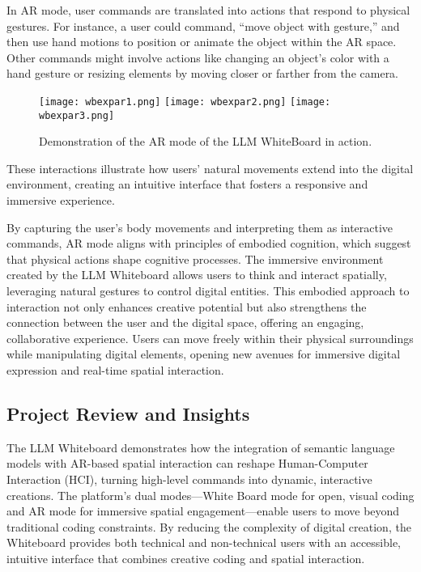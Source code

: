 In AR mode, user commands are translated into actions that respond to physical gestures.
For instance, a user could command, “move object with gesture,” and then use hand motions to position or animate the object within the AR space.
Other commands might involve actions like changing an object’s color with a hand gesture or resizing elements by moving closer or farther from the camera.

\begin{figure}[h!]
    \centering
    \texttt{[image: wbexpar1.png]}
    \texttt{[image: wbexpar2.png]}
    \texttt{[image: wbexpar3.png]}
    \caption{Demonstration of the AR mode of the LLM WhiteBoard in action.}
    \vspace{0.1cm}
    \label{fig:wbdemo1}
\end{figure}

These interactions illustrate how users’ natural movements extend into the digital environment, creating an intuitive interface that fosters a responsive and immersive experience.

By capturing the user's body movements and interpreting them as interactive commands, AR mode aligns with principles of embodied cognition, which suggest that physical actions shape cognitive processes.
The immersive environment created by the LLM Whiteboard allows users to think and interact spatially, leveraging natural gestures to control digital entities.
This embodied approach to interaction not only enhances creative potential but also strengthens the connection between the user and the digital space, offering an engaging, collaborative experience.
Users can move freely within their physical surroundings while manipulating digital elements, opening new avenues for immersive digital expression and real-time spatial interaction.


\subsection{Project Review and Insights }

The LLM Whiteboard demonstrates how the integration of semantic language models with AR-based spatial interaction can reshape Human-Computer Interaction (HCI), turning high-level commands into dynamic, interactive creations.
The platform’s dual modes—White Board mode for open, visual coding and AR mode for immersive spatial engagement—enable users to move beyond traditional coding constraints.
By reducing the complexity of digital creation, the Whiteboard provides both technical and non-technical users with an accessible, intuitive interface that combines creative coding and spatial interaction.

